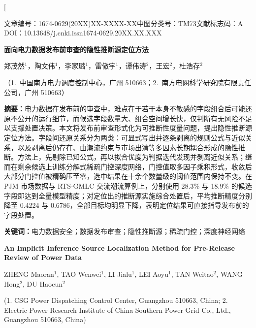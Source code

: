 \documentclass[UTF8,zihao=5,twoside,fontset=none]{ctexart}
\newcommand{\articleinfo}{文章编号：1674-0629(20XX)XX-XXXX-XX\quad 中图分类号：TM73\quad 文献标志码：A\\
DOI：10.13648/j.cnki.issn1674-0629.20XX.XX.XXX}
\begin{document}
\twocolumn[

\begin{center}
{\articleinfo}\par\vspace{1.0em}
{\sffamily{}\bfseries 面向电力数据发布前审查的隐性推断源定位方法}\par\vspace{0.8em}
{郑茂然$^{1}$，陶文伟$^{1}$，李家璐$^{1}$，雷傲宇$^{1}$，谭伟涛$^{2}$，王宏$^{2}$，杜浩存$^{2}$}\par\vspace{0.4em}
{（1.~中国南方电力调度控制中心，广州 510663；2.~南方电网科学研究院有限责任公司，广州 510663）}\par\vspace{0.8em}
\end{center}

\noindent\textbf{摘要：}电力数据在发布前的审查中，难点在于若干本身不敏感的字段组合后可能还原不公开的运行细节，而候选字段数量大、组合空间增长快，仅判断有无风险不足以支撑处置决策。本文将发布前审查形式化为可推断性度量问题，提出隐性推断源定位方法。字段间还原关系分为两类：可显式写出并逐条剥离的规则公式与近似关系，以及剥离后仍存在、由潮流约束与市场出清等多因素长期耦合形成的隐性推断。方法上，先剔除已知公式，再以拟合优度为判据迭代发现并剥离近似关系；继而在剩余候选上训练分解式稀疏门控深度网络，门控值取多因子乘积形式，收敛后大部分门控值被精确压至零，选中结果在十余个数量级的阈值范围内保持不变。在 PJM 市场数据与 RTS-GMLC 交流潮流算例上，分别使用 28.3\% 与 18.9\% 的候选字段即达到全量模型精度；对定位出的推断源实施综合处置后，平均推断精度分别降至 0.4224 与 0.6786，全部目标均明显下降，表明定位结果可直接指导发布前的字段处置。\par
\noindent\textbf{关键词：}电力数据安全；数据发布审查；隐性推断源；稀疏门控；深度神经网络\par\vspace{0.8em}

\begin{center}
{\bfseries\large An Implicit Inference Source Localization Method for Pre-Release Review of Power Data}\par\vspace{0.5em}
{ZHENG Maoran$^{1}$, TAO Wenwei$^{1}$, LI Jialu$^{1}$, LEI Aoyu$^{1}$, TAN Weitao$^{2}$, WANG Hong$^{2}$, DU Haocun$^{2}$}\par\vspace{0.3em}
{\small (1. CSG Power Dispatching Control Center, Guangzhou 510663, China; 2. Electric Power Research Institute of China Southern Power Grid Co., Ltd., Guangzhou 510663, China)}\par\vspace{0.5em}
\end{center}
\end{document}
